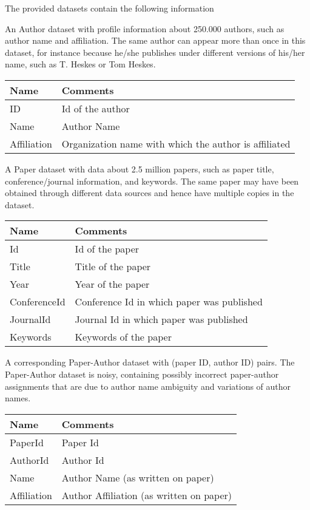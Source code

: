 The provided datasets contain the following information

An Author dataset with profile information about 250.000 authors, such as author name and affiliation. The same author can appear more than once in this dataset, for instance because he/she publishes under different versions of his/her name, such as T. Heskes or Tom Heskes.

\begin{tabular}{| l | p{8cm} |} \hline
\textbf{Name} & \textbf{Comments} \\ \hline
ID & Id of the author \\ \hline
Name & Author Name \\ \hline
Affiliation & Organization name with which the author is affiliated \\ \hline
\end{tabular}

A Paper dataset with data about 2.5 million papers, such as paper title, conference/journal information, and keywords. The same paper may have been obtained through different data sources and hence have multiple copies in the dataset.

\begin{tabular}{| l | p{8cm} |} \hline
\textbf{Name} & \textbf{Comments} \\ \hline
Id &  Id of the paper \\ \hline
Title & Title of the paper \\ \hline
Year & Year of the paper \\ \hline
ConferenceId & Conference Id in which paper was published \\ \hline
JournalId & Journal Id in which paper was published \\ \hline
Keywords &  Keywords of the paper \\\hline
\end{tabular}

A corresponding Paper-Author dataset with (paper ID, author ID) pairs. The Paper-Author dataset is noisy, containing possibly incorrect paper-author assignments that are due to author name ambiguity and variations of author names.

\begin{tabular}{| l | p{8cm} |} \hline
Name & Comments \\ \hline
PaperId & Paper Id \\ \hline
AuthorId & Author Id \\ \hline
Name  &  Author Name (as written on paper) \\ \hline
Affiliation  & Author Affiliation (as written on paper) \\ \hline
\end{tabular}


